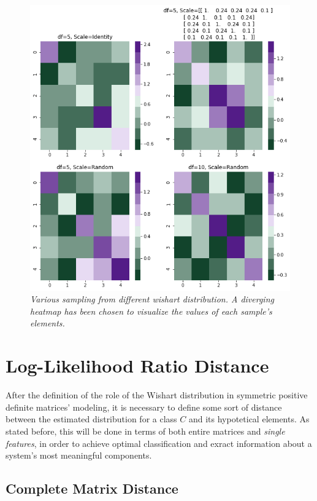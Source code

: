\documentclass[12pt,openright,twoside,a4paper]{book}
\begin{document}
\clearpage

\begin{figure}[!h]
\centering
\includegraphics[scale=0.5]{randmatr}
\caption{\textit{Various sampling from different wishart distribution. A diverging heatmap has been chosen to visualize the values of each sample's elements.}}
\label{randmatr}
\end{figure}

\section{Log-Likelihood Ratio Distance}

After the definition of the role of the Wishart distribution in symmetric positive definite matrices' modeling, it is necessary to define some sort of distance between the estimated distribution for a class $C$ and its hypotetical elements.
As stated before, this will be done in terms of both entire matrices and \textit{single features}, in order to achieve optimal classification and exract information about a system's most meaningful components.

\subsection{Complete Matrix Distance}
\end{document}
